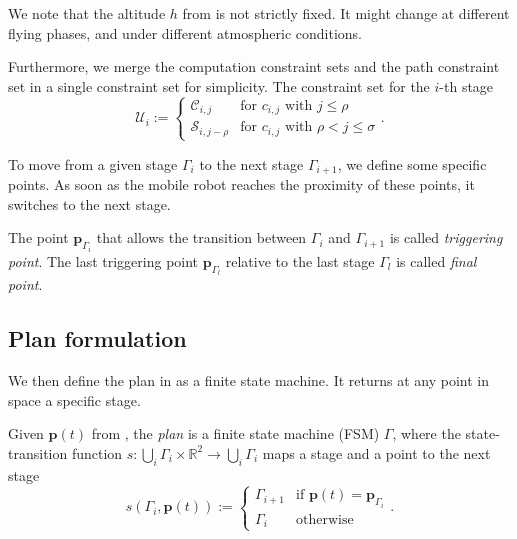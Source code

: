 We note that the altitude $h$ from  is not strictly fixed. It might change at different flying phases, and under different atmospheric conditions.

Furthermore, we merge the computation constraint sets and the path constraint set in a single constraint set for simplicity. The constraint set for the $i$-th stage
\begin{equation}\label{eq:constraint-set}
  \mathcal{U}_i:=\begin{cases}
  \mathcal{C}_{i,j} & \text{for } c_{i,j} \text{ with } j\leq\rho\\
  \mathcal{S}_{i,j-\rho} & \text{for } c_{i,j} \text{ with } \rho<j\leq\sigma
\end{cases}.\end{equation}

To move from a given stage $\Gamma_i$ to the next stage $\Gamma_{i+1}$, we define some specific points. As soon as the mobile robot reaches the proximity of these points, it switches to the next stage.

\begin{highlight}  
  \begin{defn}\label{def:trigs}
    The point $\mathbf{p}_{\Gamma_{i}}$ that allows the transition between $\Gamma_i$ and $\Gamma_{i+1}$ is called \emph{triggering point}. The last triggering point $\mathbf{p}_{\Gamma_{l}}$ relative to the last stage $\Gamma_l$ is called \emph{final point}.
  \end{defn}
\end{highlight}

\subsection{Plan formulation}

We then define the plan in  as a finite state machine. It returns at any point in space a specific stage.

\begin{highlight}  
  \begin{defn}[Plan]\label{def:plan}
    Given $\mathbf{p}(t)$ from , the \emph{plan} is a finite state machine (FSM) $\Gamma$, where the state-transition function $s:\bigcup_i{\Gamma_i}\times\mathbb{R}^2\rightarrow\bigcup_i{\Gamma_i}$ maps a stage and a point to the next stage
    \begin{equation*}s(\Gamma_i,\mathbf{p}(t)):=\begin{cases}
      \Gamma_{i+1} & \text{if }\mathbf{p}(t)=\mathbf{p}_{\Gamma_i}\\
      \Gamma_i & \text{otherwise}
    \end{cases}.\end{equation*}
  \end{defn}
\end{highlight}

